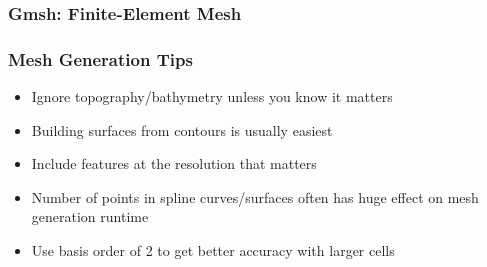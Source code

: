\documentclass[aspectratio=169]{beamer}
\begin{document}
\begin{frame}
  \frametitle{Gmsh: Finite-Element Mesh}

  
\end{frame}


\begin{frame}
  \frametitle{Mesh Generation Tips}

  \begin{itemize}
    \begin{itemize}
    \item Ignore topography/bathymetry unless you know it matters
    \end{itemize}\pause
    \begin{itemize}
    \item Building surfaces from contours is usually easiest
    \item Include features at the resolution that matters
    \end{itemize}\pause
    \begin{itemize}
    \item Number of points in spline curves/surfaces often has huge effect on mesh generation runtime
    \item Use basis order of 2 to get better accuracy with larger cells
    \end{itemize}
  \end{itemize}

\end{frame}
\end{document}
